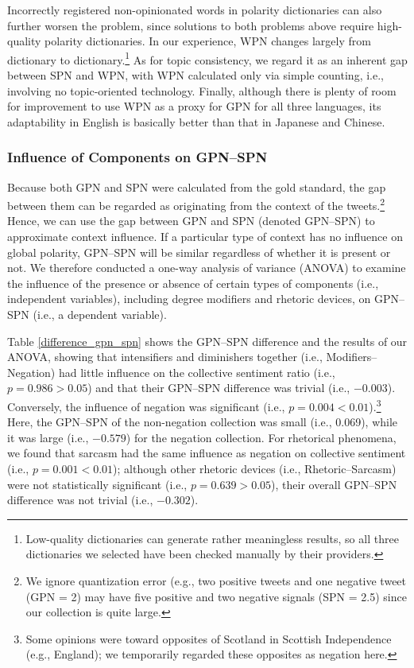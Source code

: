\documentclass[english]{jnlp_1.4}
\begin{document}
Incorrectly registered non-opinionated words in polarity dictionaries can also further worsen the problem, since solutions to both problems above require high-quality polarity dictionaries. In our experience, WPN changes largely from dictionary to dictionary.\footnote{Low-quality dictionaries can generate rather meaningless results, so all three dictionaries we selected have been checked manually by their providers.} As for topic consistency, we regard it as an inherent gap between SPN and WPN, with WPN calculated only via simple counting, i.e., involving no topic-oriented technology. Finally, although there is plenty of room for improvement to use WPN as a proxy for GPN for all three languages, its adaptability in English is basically better than that in Japanese and Chinese.


\subsubsection{Influence of Components on GPN--SPN}

Because both GPN and SPN were calculated from the gold standard, the gap between them can be regarded as originating from the context of the tweets.\footnote{We ignore quantization error (e.g., two positive tweets and one negative tweet (GPN = 2) may have five positive and two negative signals (SPN = 2.5) since our collection is quite large.} Hence, we can use the gap between GPN and SPN (denoted GPN--SPN) to approximate context influence. If a particular type of context has no influence on global polarity, GPN--SPN will be similar regardless of whether it is present or not. We therefore conducted a one-way analysis of variance (ANOVA) to examine the influence of the presence or absence of certain types of components (i.e., independent variables), including degree modifiers and rhetoric devices, on GPN--SPN (i.e., a dependent variable).

\begin{table}[b]
\label{difference_gpn_spn}

\end{table}

Table \ref{difference_gpn_spn} shows the GPN--SPN difference and the results of our ANOVA, showing that intensifiers and diminishers together (i.e., Modifiers--Negation) had little influence on the collective sentiment ratio (i.e., $p = 0.986 > 0.05$) and that their GPN--SPN difference was trivial (i.e., $-0.003$). Conversely, the influence of negation was significant (i.e., $p = 0.004 < 0.01$).\footnote{Some opinions were toward opposites of Scotland in Scottish Independence (e.g., England); we temporarily regarded these opposites as negation here.} Here, the GPN--SPN of the non-negation collection was small (i.e., 0.069), while it was large (i.e., $-0.579$) for the negation collection. For rhetorical phenomena, we found that sarcasm had the same influence as negation on collective sentiment (i.e., $p = 0.001 < 0.01$); although other rhetoric devices (i.e., Rhetoric--Sarcasm) were not statistically significant (i.e., $p = 0.639 > 0.05$), their overall GPN--SPN difference was not trivial (i.e., $-0.302$).
 
\end{document}

